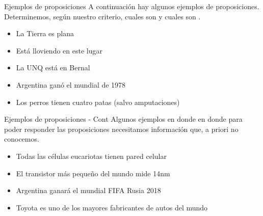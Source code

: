 

\begin{frame}{Ejemplos de proposiciones}
  A continuación hay algunos ejemplos de proposiciones.
  Determinemos, según nuestro criterio, cuales son \fulltrue y
  cuales son \fullfalse.
  \begin{itemize}
    \item La Tierra es plana
    \item Está lloviendo en este lugar
    \item La UNQ está en Bernal
    \item Argentina ganó el mundial de 1978
    \item Los perros tienen cuatro patas (salvo amputaciones)
  \end{itemize}
\end{frame}


\begin{frame}{Ejemplos de proposiciones - Cont}
  Algunos ejemplos en donde en donde para poder responder las
  proposiciones necesitamos información que, a priori no
  conocemos.
  \begin{itemize}
    \item Todas las células eucariotas tienen pared celular
    \item El transistor más pequeño del mundo mide 14nm
    \item Argentina ganará el mundial FIFA Rusia 2018
    \item Toyota es uno de los mayores fabricantes de autos del mundo
  \end{itemize}
\end{frame}

